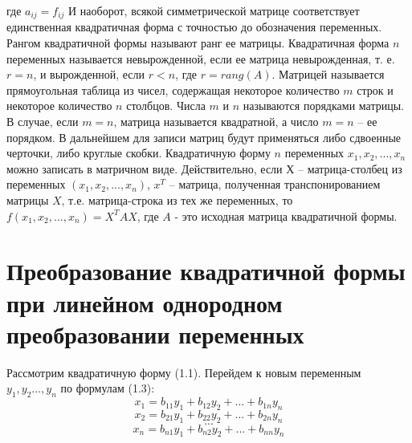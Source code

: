 \documentclass[bachelor, och, coursework, times]{SCWorks}
\newcommand\tab[1][1cm]{\hspace*{#1}}
\newcommand{\tl}{\newline\tab}
\begin{document}
где $a_{ij}=f_{ij}$
\tl
И наоборот, всякой симметрической матрице соответствует единственная квадратичная форма с точностью до обозначения переменных.
\tl
Рангом квадратичной формы называют ранг ее матрицы. Квадратичная форма $n$ переменных называется невырожденной, если ее матрица невырожденная, т. е. $r = n$, и вырожденной, если $r < n$, где $r=rang(A)$. 
\tl
Матрицей называется прямоугольная таблица из чисел, содержащая некоторое количество $m$ строк и некоторое количество $n$ столбцов. Числа $m$ и $n$ называются порядками матрицы. В случае, если $m = n$, матрица называется квадратной, а число $m= n$ – ее порядком.
\tl
В дальнейшем для записи матриц будут применяться либо сдвоенные черточки, либо круглые скобки.
\tl
Квадратичную форму $n$ переменных $x_1, x_2,...,x_n$ можно записать в матричном виде. Действительно, если $Х$ – матрица-столбец из переменных $(x_1, x_2,...,x_n)$, $x^{T}$ – матрица, полученная транспонированием матрицы $X$, т.е. матрица-строка из тех же переменных, то $f(x_1, x_2,...,x_n)= X^{T}AX$, где $A$ - это исходная матрица квадратичной формы.

\section{Преобразование квадратичной формы при линейном однородном преобразовании переменных}
\tab Рассмотрим квадратичную форму (1.1). Перейдем к новым переменным $y_1, y_2…,y_n$ по формулам (1.3):
$$x_1=b_{11}y_1+b_{12}y_2+...+b_{1n}y_n$$
$$x_2=b_{21}y_1+b_{22}y_2+...+b_{2n}y_n$$
$$...$$
$$x_n=b_{n1}y_1+b_{n2}y_2+...+b_{nn}y_n$$
\end{document}
